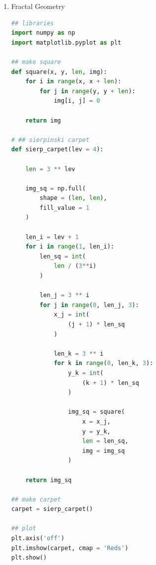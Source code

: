 \documentclass{article}
\begin{document}
\begin{enumerate}
\begin{lstlisting}[language=Python, title=Python 3: Rossler Model for Chemical Reactions]
        xs[i+1] = xs[i] + (x_dot * dt)
        ys[i+1] = ys[i] + (y_dot * dt)
        zs[i+1] = zs[i] + (z_dot * dt)

    return xs, ys, zs

## comp traj
xs, ys, zs = rossler_differ(
    step = 100000,
    dt = 0.001
)

## plot
fig = plt.figure()
ax = Axes3D(fig)
ax.plot(xs, ys, zs, lw = 1)
ax.set_xlabel('x')
ax.set_ylabel('y')
ax.set_zlabel('z')
plt.show()\end{lstlisting}

\newpage
    \item Fractal Geometry
    \begin{lstlisting}[language=Python, title=Python 3: Fractal Geometry for Sierpenski Carpet]
## libraries
import numpy as np
import matplotlib.pyplot as plt

## make square
def square(x, y, len, img):
    for i in range(x, x + len):
        for j in range(y, y + len):
            img[i, j] = 0

    return img

# ## sierpinski carpet
def sierp_carpet(lev = 4):

    len = 3 ** lev

    img_sq = np.full(
        shape = (len, len),
        fill_value = 1
    )

    len_i = lev + 1
    for i in range(1, len_i):
        len_sq = int(
            len / (3**i)
        )

        len_j = 3 ** i
        for j in range(0, len_j, 3):
            x_j = int(
                (j + 1) * len_sq
            )
            
            len_k = 3 ** i
            for k in range(0, len_k, 3):
                y_k = int(
                    (k + 1) * len_sq
                )

                img_sq = square(
                    x = x_j, 
                    y = y_k, 
                    len = len_sq, 
                    img = img_sq
                )

    return img_sq

## make carpet
carpet = sierp_carpet()

## plot
plt.axis('off')
plt.imshow(carpet, cmap = 'Reds')
plt.show()\end{lstlisting}

\end{enumerate}
\end{document}
